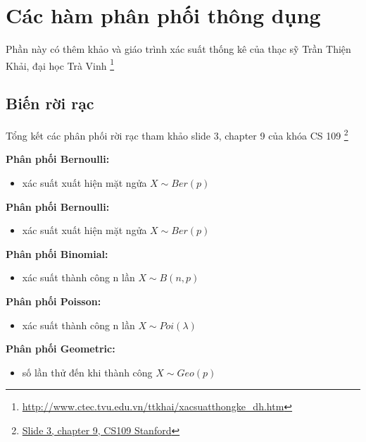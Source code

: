 \section{Các hàm phân phối thông dụng}

Phần này có thêm khảo \cite{Goodfellow-et-al-2016} và giáo trình xác suất thống kê của thạc sỹ Trần Thiện Khải, đại học Trà Vinh  \footnote{\href{http://www.ctec.tvu.edu.vn/ttkhai/xacsuatthongke_dh.htm}{http://www.ctec.tvu.edu.vn/ttkhai/xacsuatthongke\_dh.htm}}

\subsection{Biến rời rạc}

Tổng kết các phân phối rời rạc tham khảo slide 3, chapter 9 của khóa CS 109 \footnote{\href{https://web.stanford.edu/class/archive/cs/cs109/cs109.1166/ppt/9-ContinuousDist.pdf}{Slide 3, chapter 9, CS109 Stanford}}

\textbf{Phân phối Bernoulli:}

\begin{itemize}
  \item xác suất xuất hiện mặt ngửa $X \sim Ber(p)$
\end{itemize}

\textbf{Phân phối Bernoulli:}

\begin{itemize}
  \item xác suất xuất hiện mặt ngửa $X \sim Ber(p)$
\end{itemize}

\textbf{Phân phối Binomial:}

\begin{itemize}
  \item xác suất thành công n lần $X \sim B(n,p)$
\end{itemize}

\textbf{Phân phối Poisson:}

\begin{itemize}
  \item xác suất thành công n lần $X \sim Poi(\lambda)$
\end{itemize}

\textbf{Phân phối Geometric:}

\begin{itemize}
  \item số lần thử đến khi thành công $X \sim Geo(p)$
\end{itemize}

